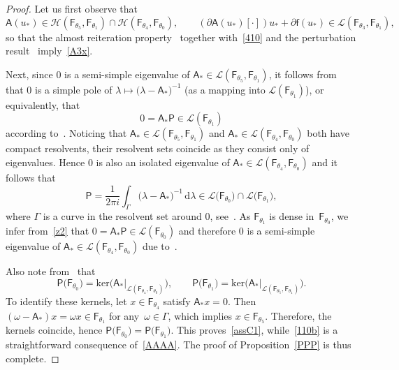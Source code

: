 \documentclass[reqno,11pt]{amsart}
\numberwithin{equation}{section}
\newcommand{\rd}{\mathrm{d}}
\theoremstyle{remark}
\begin{document}
\begin{proof}
Let us first observe that
$$
\mathsf{A}(u_*)\in\mathcal{H}(\mathsf{F}_{\theta_5},\mathsf{F}_{\theta_1}) \cap \mathcal{H}(\mathsf{F}_{\theta_4},\mathsf{F}_{\theta_0}),\qquad (\partial \mathsf{A}(u_*)[\cdot]) u_* +\partial \mathsf{f}(u_*)\in\mathcal{L}(\mathsf{F}_{\theta_3},\mathsf{F}_{\theta_1}),
$$
 so that the almost reiteration property~\cite[I.Remarks~2.11.2~(a)]{LQPP} together with~\eqref{410} and the perturbation result~\cite[I.Theorem~1.3.1~(ii)]{LQPP} imply~\eqref{A3x}. 

 Next, since  $0$ is  a semi-simple eigenvalue of $\mathsf{A}_*\in  \mathcal{L}(\mathsf{F}_{\theta_5},\mathsf{F}_{\theta_1})$, it follows from~\cite[Proposition~A.2.2]{L95} that 0 is a simple pole of $\lambda\mapsto  \big(\lambda-\mathsf{A}_*\big)^{-1}$ (as a mapping into $\mathcal{L}(\mathsf{F}_{\theta_1})$), or equivalently, that 
\begin{equation}\label{z2}
0=\mathsf{A}_*\mathsf{P}\in \mathcal{L}(\mathsf{F}_{\theta_1})
\end{equation} 
according to~\cite[Proposition~A.2.1]{L95}.  Noticing that $\mathsf{A}_*\in\mathcal{L}(\mathsf{F}_{\theta_5},\mathsf{F}_{\theta_1})$ and  $\mathsf{A}_*\in\mathcal{L}(\mathsf{F}_{\theta_4},\mathsf{F}_{\theta_0})$ both have compact resolvents, their resolvent sets coincide as they consist only of eigenvalues. Hence 0 is also an isolated eigenvalue of $\mathsf{A}_*\in\mathcal{L}(\mathsf{F}_{\theta_4},\mathsf{F}_{\theta_0})$ and it follows that
$$
\mathsf{P}=\frac{1}{2\pi i}\int_{\Gamma} \big(\lambda-\mathsf{A}_*\big)^{-1}\,\rd\lambda \in \mathcal{L}\big(\mathsf{F}_{\theta_0}\big)\cap \mathcal{L}\big(\mathsf{F}_{\theta_1}\big),
$$
where $\Gamma$ is a curve in the resolvent set around 0, see~\cite[Appendix~A]{L95}. 
As $\mathsf{F}_{\theta_1}$ is dense in~$\mathsf{F}_{\theta_0}$, we infer from~\eqref{z2} that $0=\mathsf{A}_*\mathsf{P}\in \mathcal{L}(\mathsf{F}_{\theta_0})$ and therefore 0 is a semi-simple eigenvalue of $\mathsf{A}_*\in \mathcal{L}(\mathsf{F}_{\theta_4},\mathsf{F}_{\theta_0})$ due to~\cite[Proposition~A.2.2]{L95}.

Also note from~\cite[Proposition~A.2.2]{L95} that 
$$
\mathsf{P}\big(\mathsf{F}_{\theta_0}\big)=\mathrm{ker}\Big(\mathsf{A}_*\big\vert_{\mathcal{L}(\mathsf{F}_{\theta_4},\mathsf{F}_{\theta_0})}\Big), \qquad
\mathsf{P}\big(\mathsf{F}_{\theta_1}\big)=\mathrm{ker}\Big(\mathsf{A}_*\big\vert_{\mathcal{L}(\mathsf{F}_{\theta_5},\mathsf{F}_{\theta_1})}\Big).
$$
To identify these kernels, let $x\in \mathsf{F}_{\theta_4}$ satisfy $\mathsf{A}_*x=0$. 
Then  $(\omega-\mathsf{A}_*)x=\omega x\in \mathsf{F}_{\theta_1}$ for any~$\omega\in \Gamma$,  which implies $x\in \mathsf{F}_{\theta_5}$.  
Therefore, the kernels coincide, hence $\mathsf{P}\big(\mathsf{F}_{\theta_0}\big)=\mathsf{P}\big(\mathsf{F}_{\theta_1}\big)$. 
 This proves~\eqref{assC1}, while~\eqref{110b} is a straightforward consequence of~\eqref{AAAA}. 
 The proof of Proposition~\ref{PPP} is thus complete.
\end{proof}
\end{document}
